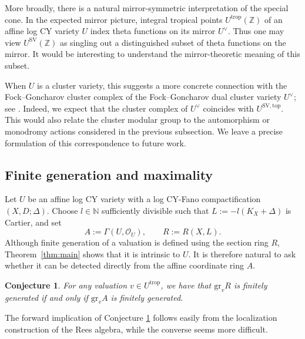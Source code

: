 \documentclass[reqno, 12pt]{amsart}
\newtheorem{conj}[prop]{Conjecture}
\theoremstyle{definition}
\newcommand{\bZ}{\mathbb{Z}}
\newcommand{\bN}{\mathbb{N}}
\newcommand{\cO}{\mathcal{O}}
\newcommand{\gr}{\mathrm{gr}}
\newcommand{\trop}{\mathrm{trop}}
\newcommand{\SV}{\mathrm{SV}}
\numberwithin{equation}{section}
\newcommand{\YL}[1]{{\textcolor{blue}{[Yuchen: #1]}}}
\begin{document}
More broadly, there is a natural mirror-symmetric interpretation of the special cone. In the expected mirror picture, integral tropical points $U^{\trop}(\bZ)$ of an
affine log CY variety $U$ index theta functions on its mirror
$U^\vee$. Thus one may view $U^{\SV}(\bZ)$ as singling out
a distinguished subset of theta functions on the mirror. It would be
interesting to understand the mirror-theoretic meaning of this subset.

When $U$ is a cluster variety, this suggests a more concrete
connection with the Fock--Goncharov cluster complex of the Fock--Goncharov 
dual cluster variety $U^\vee$; see \cite{GHKK18}. Indeed, we expect that the cluster complex of $U^\vee$ coincides with $U^{\SV, \mathrm{top}}$. This would also
relate the cluster modular group to the automorphism or monodromy
actions considered in the previous subsection. We leave a precise
formulation of this correspondence to future work.



\subsection{Finite generation and maximality}
Let $U$ be an affine log CY variety with a log CY-Fano compactification
$(X,D;\Delta)$. Choose $l\in \bN$ sufficiently divisible such that $L:=-l(K_X+\Delta)$
is Cartier, and set
\[
A:=\Gamma(U,\cO_U),\qquad R:=R(X,L).
\]
Although finite generation of a valuation is defined using the section
ring $R$, Theorem~\ref{thm:main} shows that it is intrinsic to $U$. It is
therefore natural to ask whether it can be detected directly from the
affine coordinate ring $A$.

\begin{conj}\label{conj:fg-affine}
    For any valuation $v\in U^{\trop}$, we have that $\gr_v R$ is finitely generated if and only if $\gr_v A$ is finitely generated.
\end{conj}

The forward implication of Conjecture \ref{conj:fg-affine} follows easily from the localization construction of
the Rees algebra, while the converse seems more difficult.
\end{document}
